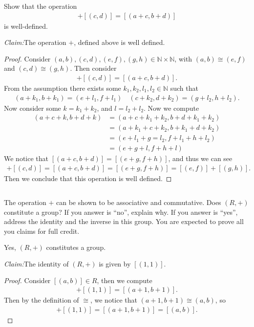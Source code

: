 \documentclass[10pt]{armath}
\newcommand{\N}{\mathbb{N}}
\newenvironment{claim}[1]{\par\noindent\textit{Claim:}\space#1}{}
\begin{document}
Show that the operation
\begin{align*}
  [(a,b)]+[(c,d)]=[(a+c,b+d)]
\end{align*}
is well-defined.

\begin{claim}
  The operation $+$, defined above is well defined.
\end{claim}
\begin{proof}
  Consider $(a,b),(c,d),(e,f),(g,h)\in\N\times\N$, with $(a,b)\cong(e,f)$ and
  $(c,d)\cong(g,h)$. Then consider
  \begin{align*}
    [(a,b)]+[(c,d)]=[(a+c,b+d)].
  \end{align*}
  From the assumption there exists some $k_1,k_2,l_1,l_2\in\N$ such that
  \begin{align*}
    (a+k_1,b+k_1)=(e+l_1,f+l_1)\quad(c+k_2,d+k_2)=(g+l_2,h+l_2).
  \end{align*}
  Now consider some $k=k_1+k_2$, and $l=l_2+l_2$. Now we compute
  \begin{align*}
    (a+c+k,b+d+k)&=(a+c+k_1+k_2,b+d+k_1+k_2)\\
    &=(a+k_1+c+k_2,b+k_1+d+k_2)\\
    &=(e+l_1+g=l_2,f+l_1+h+l_2)\\
    &=(e+g+l,f+h+l)
  \end{align*}
  We notice that $[(a+c,b+d)]=[(e+g,f+h)]$, and thus we can see
  \begin{align*}
    [(a,b)]+[(c,d)]=[(a+c,b+d)]=[(e+g,f+h)]=[(e,f)]+[(g,h)].
  \end{align*}
  Then we conclude that this operation is well defined.
\end{proof}

\subsection{}%
\label{sub:1c}

The operation $+$ can be shown to be associative and commutative. Does $(R,+)$
constitute a group? If you answer is ``no'', explain why. If you answer is
``yes'', address the identity and the inverse in this group. You are expected to
prove all you claims for full credit.

Yes, $(R,+)$ constitutes a group.
\begin{claim}
  The identity of $(R,+)$ is given by $[(1,1)]$.
\end{claim}
\begin{proof}
  Consider $[(a,b)]\in R$, then we compute
  \begin{align*}
    [(a,b)]+[(1,1)]=[(a+1,b+1)].
  \end{align*}
  Then by the definition of $\cong$, we notice that $(a+1,b+1)\cong(a,b)$, so
  \begin{align*}
    [(a,b)]+[(1,1)]=[(a+1,b+1)]=[(a,b)].
  \end{align*}
\end{proof}
\end{document}
